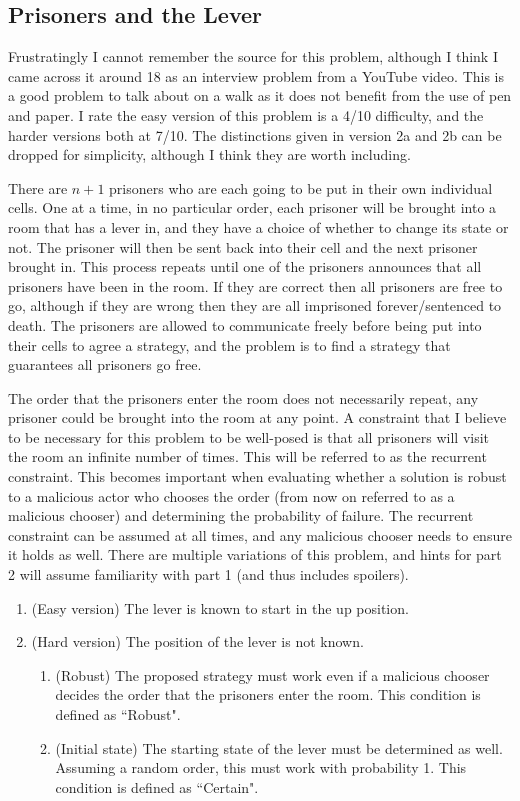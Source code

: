 \subsection{Prisoners and the Lever}

Frustratingly I cannot remember the source for this problem, although I think I came across it around 18 as an interview problem from a YouTube video. This is a good problem to talk about on a walk as it does not benefit from the use of pen and paper. I rate the easy version of this problem is a 4/10 difficulty, and the harder versions both at 7/10. The distinctions given in version 2a and 2b can be dropped for simplicity, although I think they are worth including.

There are $n + 1$ prisoners who are each going to be put in their own individual cells. One at a time, in no particular order, each prisoner will be brought into a room that has a lever in, and they have a choice of whether to change its state or not. The prisoner will then be sent back into their cell and the next prisoner brought in. This process repeats until one of the prisoners announces that all prisoners have been in the room. If they are correct then all prisoners are free to go, although if they are wrong then they are all imprisoned forever/sentenced to death. The prisoners are allowed to communicate freely before being put into their cells to agree a strategy, and the problem is to find a strategy that guarantees all prisoners go free.

The order that the prisoners enter the room does not necessarily repeat, any prisoner could be brought into the room at any point. A constraint that I believe to be necessary for this problem to be well-posed is that all prisoners will visit the room an infinite number of times. This will be referred to as the recurrent constraint. This becomes important when evaluating whether a solution is robust to a malicious actor who chooses the order (from now on referred to as a malicious chooser) and determining the probability of failure. The recurrent constraint can be assumed at all times, and any malicious chooser needs to ensure it holds as well. There are multiple variations of this problem, and hints for part 2 will assume familiarity with part 1 (and thus includes spoilers).

\begin{enumerate}
	\item (Easy version) The lever is known to start in the up position.
	\item (Hard version) The position of the lever is not known.
	\begin{enumerate}
		\item (Robust) The proposed strategy must work even if a malicious chooser decides the order that the prisoners enter the room. This condition is defined as ``Robust".
		\item (Initial state) The starting state of the lever must be determined as well. Assuming a random order, this must work with probability 1. This condition is defined as ``Certain".
	\end{enumerate}
\end{enumerate}

